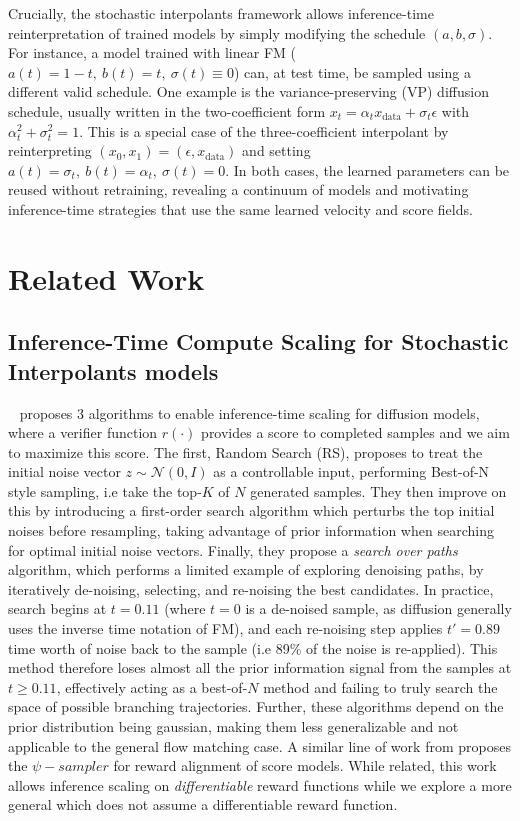 \documentclass{article} %
\begin{document}
Crucially, the stochastic interpolants framework allows inference-time reinterpretation of trained
models by simply modifying the schedule $(a,b,\sigma)$. For instance, a model trained with linear FM
($a(t)=1-t,\ b(t)=t,\ \sigma(t)\equiv 0$) can, at test time, be sampled using a different valid
schedule. One example is the variance-preserving (VP) diffusion schedule, usually written in the two-coefficient
form $x_t=\alpha_t x_{\mathrm{data}}+\sigma_t \epsilon$ with $\alpha_t^2+\sigma_t^2=1$.
This is a special case of the three-coefficient interpolant by reinterpreting $(x_0,x_1)=(\epsilon,
x_{\mathrm{data}})$ and setting $a(t)=\sigma_t,\ b(t)=\alpha_t,\ \sigma(t)=0$.
In both cases, the learned parameters can be reused without retraining, revealing a continuum of
models and motivating inference-time strategies that use the same learned velocity and score fields.

\section{Related Work}
\label{sec:related}

\subsection{Inference-Time Compute Scaling for Stochastic Interpolants models}
\label{sec:related-fmscaling}

~\cite{ma2025diffits} proposes 3 algorithms to enable inference-time scaling for diffusion models, where a verifier function \( r(\cdot) \) provides a score to completed samples and we aim to maximize this score. The first, Random Search (RS), proposes to treat the initial noise vector \( z \sim \mathcal{N}(0, I) \) as a controllable input, performing Best-of-N style sampling, i.e take the top-$K$ of $N$ generated samples. They then improve on this by introducing a first-order search algorithm which perturbs the top initial noises before resampling, taking advantage of prior information when searching for optimal initial noise vectors. Finally, they propose a \textit{search over paths} algorithm, which performs a limited example of exploring denoising paths, by iteratively de-noising, selecting, and re-noising the best candidates. In practice, search begins at \( t = 0.11 \) (where $t=0$ is a de-noised sample, as diffusion generally uses the inverse time notation of FM), and each re-noising step applies \( t' = 0.89 \) time worth of noise back to the sample (i.e 89\% of the noise is re-applied). This method therefore loses almost all the prior information signal from the samples at \( t \ge 0.11 \), effectively acting as a best-of-\( N \) method and failing to truly search the space of possible branching trajectories. Further, these algorithms depend on the prior distribution being gaussian, making them less generalizable and not applicable to the general flow matching case. A similar line of work from \citet{psisampler} proposes the $\psi-sampler$ for reward alignment of score models. While related, this work allows inference scaling on \textit{differentiable} reward functions while we explore a more general which does not assume a differentiable reward function.
\end{document}
